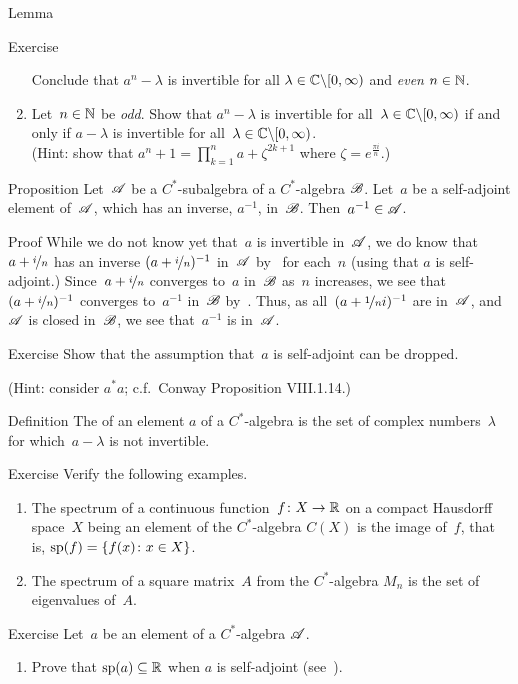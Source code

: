\documentclass[main]{subfiles}
\begin{document}
\begin{parsec}
\begin{point}{Lemma}
\begin{point}{Exercise}
\begin{enumerate}
Conclude that $a^n-\lambda$ is invertible for all 
$\lambda\in\mathbb{C}\backslash[0,\infty)$ and \emph{even} $n\in\mathbb{N}$.
\item
Let~$n\in \mathbb{N}$ be \emph{odd}.
Show that $a^n-\lambda$ is invertible
for all~$\lambda\in \mathbb{C}\backslash[0,\infty)$
if and only if $a-\lambda$ is invertible
for all~$\lambda\in \mathbb{C}\backslash[0,\infty)$.\\
(Hint: show that
$a^n+1= \prod_{k=1}^n a+\zeta^{2k+1}$
where $\zeta=e^{\frac{\pi i}{n}}$.)
\end{enumerate}
\end{point}
\end{point}
\begin{point}{Proposition}%
Let~$\mathscr{A}$ be a $C^*$-subalgebra
of a $C^*$-algebra $\mathscr{B}$.
Let~$a$ be a self-adjoint element of~$\mathscr{A}$,
which has an inverse, $a^{-1}$, in~$\mathscr{B}$.
Then~$a^{-1}\in\mathscr{A}$.
\begin{point}{Proof}%
While we do not know yet that~$a$ is invertible in~$\mathscr{A}$,
we do know that~$a+\nicefrac{i}{n}$ 
has an inverse $(a+\nicefrac{i}{n})^{-1}$ in~$\mathscr{A}$
by~
for each~$n$
(using that $a$ is self-adjoint.)
Since~$a+\nicefrac{i}{n}$ converges to~$a$ in~$\mathscr{B}$ as~$n$ increases,
we see that $(a+\nicefrac{i}{n})^{-1}$ converges to~$a^{-1}$
in~$\mathscr{B}$ by~.
Thus, as all~$(a+\nicefrac{1}{n}i)^{-1}$ are in~$\mathscr{A}$,
and~$\mathscr{A}$ is closed in~$\mathscr{B}$,
we see that~$a^{-1}$ is in~$\mathscr{A}$.
\end{point}
\begin{point}{Exercise}%
Show that the assumption that~$a$ is self-adjoint
can be dropped. 

(Hint: consider $a^*a$; c.f.~Conway Proposition VIII.1.14.)
\end{point}
\end{point}
\begin{point}{Definition}%
The  of an element $a$
of a $C^*$-algebra
is the set 
of complex numbers~$\lambda$
for which~$a-\lambda$ is not invertible.
\begin{point}{Exercise}%
Verify the following examples.
\begin{enumerate}
\item
The spectrum of a continuous function~$f\colon X\to \mathbb{R}$
on a compact Hausdorff space~$X$
being an element of the $C^*$-algebra $C(X)$
is the image of~$f$, that is,
$\mathrm{sp}(f) = \{f(x)\colon x\in X\}$.
\item
The spectrum of a square matrix~$A$
from the $C^*$-algebra $M_n$
is the set of eigenvalues of~$A$.
\end{enumerate}
\end{point}
\begin{point}{Exercise}%
Let~$a$ be an element of a $C^*$-algebra $\mathscr{A}$.
\begin{enumerate}
\item
Prove that $\mathrm{sp}(a)\subseteq \mathbb{R}$ when $a$ is self-adjoint
(see~).


\end{enumerate}
\end{point}
\end{point}
\end{parsec}
\end{document}
